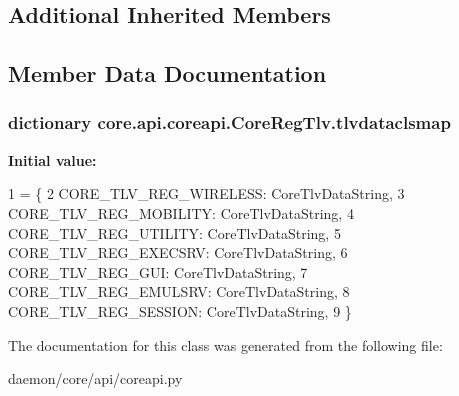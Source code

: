 \subsection*{Additional Inherited Members}


\subsection{Member Data Documentation}
\hypertarget{classcore_1_1api_1_1coreapi_1_1_core_reg_tlv_a8a75442d53ee9be7f657887dfb441698}{
\subsubsection[{tlvdataclsmap}]{\setlength{\rightskip}{0pt plus 5cm}dictionary core.\+api.\+coreapi.\+Core\+Reg\+Tlv.\+tlvdataclsmap\hspace{0.3cm}{\ttfamily [static]}}}\label{classcore_1_1api_1_1coreapi_1_1_core_reg_tlv_a8a75442d53ee9be7f657887dfb441698}
{\bfseries Initial value\+:}
\begin{DoxyCode}
1 = \{
2         CORE\_TLV\_REG\_WIRELESS: CoreTlvDataString,
3         CORE\_TLV\_REG\_MOBILITY: CoreTlvDataString,
4         CORE\_TLV\_REG\_UTILITY: CoreTlvDataString,
5         CORE\_TLV\_REG\_EXECSRV: CoreTlvDataString,
6         CORE\_TLV\_REG\_GUI: CoreTlvDataString,
7         CORE\_TLV\_REG\_EMULSRV: CoreTlvDataString,
8         CORE\_TLV\_REG\_SESSION: CoreTlvDataString,
9     \}
\end{DoxyCode}


The documentation for this class was generated from the following file\+:\begin{DoxyCompactItemize}
\item 
daemon/core/api/coreapi.\+py\end{DoxyCompactItemize}
